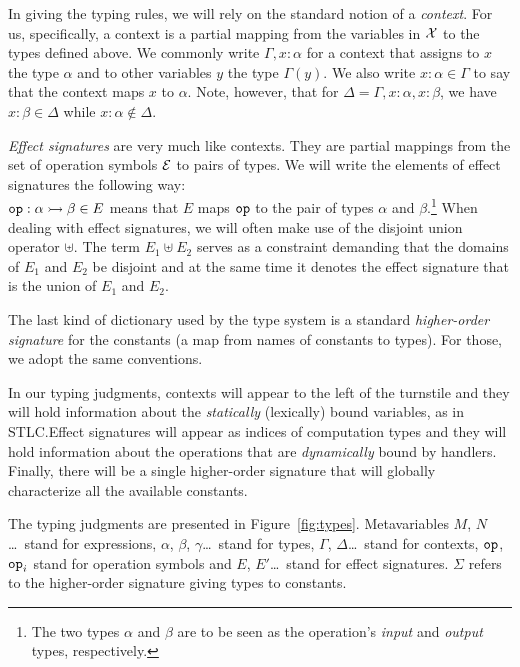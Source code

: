 In giving the typing rules, we will rely on the standard notion of a
\emph{context}. For us, specifically, a context is a partial mapping from
the variables in $\mathcal{X}$ to the types defined above.  We commonly write
$\Gamma, x : \alpha$ for a context that assigns to $x$ the type $\alpha$
and to other variables $y$ the type $\Gamma(y)$. We also write
$x : \alpha \in \Gamma$ to say that the context maps $x$ to $\alpha$. Note,
however, that for $\Delta = \Gamma, x : \alpha, x : \beta$, we have
$x : \beta \in \Delta$ while $x : \alpha \notin \Delta$.

\emph{Effect signatures} are very much like contexts. They are partial
mappings from the set of operation symbols $\mathcal{E}$ to pairs of types. We will
write the elements of effect signatures the following way: \\
$\mathtt{op} : \alpha \rightarrowtail \beta \in E$ means that $E$ maps $\mathtt{op}$ to the
pair of types $\alpha$ and $\beta$.\footnote{The two types $\alpha$ and
  $\beta$ are to be seen as the operation's \emph{input} and \emph{output}
  types, respectively.} When dealing with effect signatures, we will often
make use of the disjoint union operator $\uplus$. The term $E_1 \uplus E_2$
serves as a constraint demanding that the domains of $E_1$ and $E_2$ be
disjoint and at the same time it denotes the effect signature that is the
union of $E_1$ and $E_2$.

The last kind of dictionary used by the type system is a standard
\emph{higher-order signature} for the constants (a map from names of
constants to types). For those, we adopt the same conventions.

In our typing judgments, contexts will appear to the left of the turnstile
and they will hold information about the \emph{statically} (lexically)
bound variables, as in STLC.\@ Effect signatures will appear as indices of
computation types and they will hold information about the operations that
are \emph{dynamically} bound by handlers. Finally, there will be a single
higher-order signature that will globally characterize all the available
constants.

The typing judgments are presented in Figure~\ref{fig:types}. Metavariables
$M$, $N$\ldots\ stand for expressions, $\alpha$, $\beta$,
$\gamma$\ldots\ stand for types, $\Gamma$, $\Delta$\ldots\ stand for
contexts, $\mathtt{op}$, $\mathtt{op}_i$ stand for operation symbols and $E$,
$E'$\ldots\ stand for effect signatures. $\Sigma$ refers to the
higher-order signature giving types to constants.

\newcommand{\handlerrule}{
 \begin{prooftree}
  \AxiomC{$E = \{\typedopg{\op{op}_i}{\alpha_i}{\beta_i}\}_{i \in I} \uplus E_f$}
  \noLine
  \def\extraVskip{0pt}
  \UnaryInfC{$E' = E'' \uplus E_f$}
  \noLine
  \UnaryInfC{$[\Gamma \vdash M_i : \alpha_i \to (\beta_i \to
    \FF_{E'}(\delta)) \to \FF_{E'}(\delta)]_{i \in I}$}
  \noLine
  \UnaryInfC{$\Gamma \vdash M_\eta : \gamma \to \FF_{E'}(\delta)$}
  \noLine
  \UnaryInfC{$\Gamma \vdash N : \FF_{E}(\gamma)$}
  \def\extraVskip{2pt}
  \RightLabel{[$\banana{}$]}
  \UnaryInfC{$\Gamma \vdash \ap{\cibanana}{N} : \FF_{E'}(\delta)$}
 \end{prooftree}}

